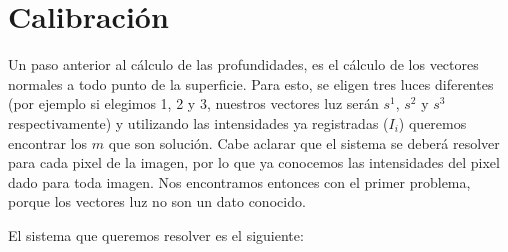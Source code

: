 



\section{Calibración}

Un paso anterior al cálculo de las profundidades, es el cálculo de los vectores normales a todo punto de la superficie. Para esto, se eligen tres luces diferentes (por ejemplo si elegimos 1, 2 y 3, nuestros vectores luz serán $s^{1}$, $s^{2}$ y $s^{3}$ respectivamente) y utilizando las intensidades ya registradas ($I_i$) queremos encontrar los $m$ que son solución. Cabe aclarar que el sistema se deberá resolver para cada pixel de la imagen, por lo que ya conocemos las intensidades del pixel dado para toda imagen. Nos encontramos entonces con el primer problema, porque los vectores luz no son un dato conocido.

El sistema que queremos resolver es el siguiente: \\

